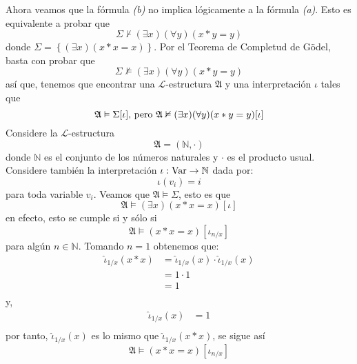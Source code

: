 \documentclass[12pt]{article}
\newcounter{it}
\theoremstyle{largebreak}
\newcommand\cf[3]{\ensuremath{#1:#2\rightarrow#3}}
\begin{document}
\begin{sol}
        Ahora veamos que la fórmula \textit{(b)} no implica lógicamente a la fórmula \textit{(a)}. Esto es equivalente a probar que
        \begin{equation*}
            \Sigma\nvdash (\exists x)(\forall y)(x*y=y)
        \end{equation*}
        donde $\Sigma=\left\{(\exists x)(x*x=x) \right\}$. Por el Teorema de Completud de Gödel, basta con probar que
        \begin{equation*}
            \Sigma\nvDash (\exists x)(\forall y)(x*y=y)
        \end{equation*}
        así que, tenemos que encontrar una $\mathcal{L}$-estructura $\mathfrak{A}$ y una interpretación $\iota$ tales que
        \begin{equation*}
            \mathfrak{A}\vDash\Sigma[\iota]\textup{, pero }\mathfrak{A}\nvDash (\exists x)(\forall y)(x*y=y)[\iota]
        \end{equation*}
        Considere la $\mathcal{L}$-estructura
        \begin{equation*}
            \mathfrak{A}=(\mathbb{N},\cdot)
        \end{equation*}
        donde $\mathbb{N}$ es el conjunto de los números naturales y $\cdot$ es el producto usual. Considere también la interpretación $\cf{\iota}{\textup{Var}}{\mathbb{N}}$ dada por:
        \begin{equation*}
            \iota(v_i)=i
        \end{equation*}
        para toda variable $v_i$. Veamos que $\mathfrak{A}\vDash\Sigma$, esto es que
        \begin{equation*}
            \mathfrak{A}\vDash(\exists x)(x*x=x)[\iota]
        \end{equation*}
        en efecto, esto se cumple si y sólo si
        \begin{equation*}
            \mathfrak{A}\vDash(x*x=x)[\iota_{n/x}]
        \end{equation*}
        para algún $n\in\mathbb{N}$. Tomando $n=1$ obtenemos que:
        \begin{equation*}
            \begin{split}
                \hat{\iota}_{1/x}(x*x)&=\hat{\iota}_{1/x}(x)\cdot\hat{\iota}_{1/x}(x)\\
                &=1\cdot 1\\
                &=1\\
            \end{split}
        \end{equation*}
        y,
        \begin{equation*}
            \begin{split}
                \hat{\iota}_{1/x}(x)&=1\\
            \end{split}
        \end{equation*}
        por tanto, $\hat{\iota}_{1/x}(x)$ es lo mismo que $\hat{\iota}_{1/x}(x*x)$, se sigue así
        \begin{equation*}
            \mathfrak{A}\vDash(x*x=x)[\iota_{n/x}]
        \end{equation*}


\end{sol}
\end{document}
